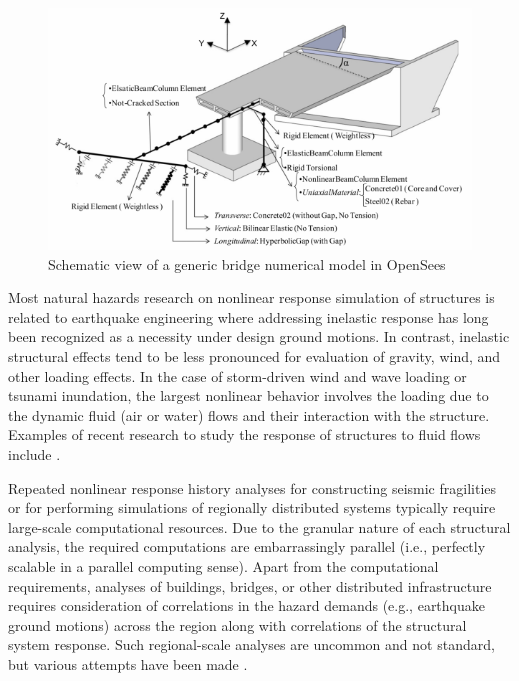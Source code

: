 \begin{figure}[htb]
    \centering
    \includegraphics[width=1.0\textwidth, angle = 0]{Figures/BridgeModel.pdf}
    \caption{Schematic view of a generic bridge numerical model in OpenSees \citep{kaviani2012seismic}}
    \label{fig:response_BridgeModel}
\end{figure}

Most natural hazards research on nonlinear response simulation of structures is related to earthquake engineering where addressing inelastic response has long been recognized as a necessity under design ground motions. In contrast, inelastic structural effects tend to be less pronounced for evaluation of gravity, wind, and other loading effects. In the case of storm-driven wind and wave loading or tsunami inundation, the largest nonlinear behavior involves the loading due to the dynamic fluid (air or water) flows and their interaction with the structure. Examples of recent research to study the response of structures to fluid flows include \cite{minjie2014modeling, minjie2018validation, ataei2015fragility, petrone2017fragility, madurapperuma2013response, attary2016methodology}.

Repeated nonlinear response history analyses for constructing seismic fragilities or for performing simulations of regionally distributed systems typically require large-scale computational resources. Due to the granular nature of each structural analysis, the required computations are embarrassingly parallel (i.e., perfectly scalable in a parallel computing sense). Apart from the computational requirements, analyses of buildings, bridges, or other distributed infrastructure requires consideration of correlations in the hazard demands (e.g., earthquake ground motions) across the region along with correlations of the structural system response. Such regional-scale analyses are uncommon and not standard, but various attempts have been made \citep[see e.g.][]{miller2015estimating}.

